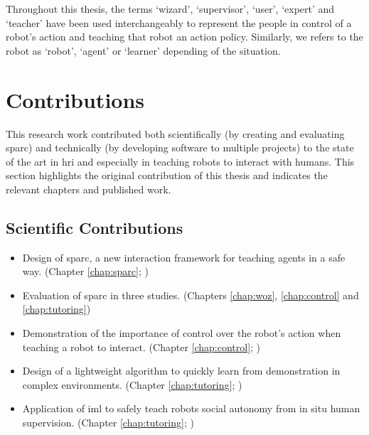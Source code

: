 Throughout this thesis, the terms `wizard', `supervisor', `user', `expert' and `teacher' have been used interchangeably to represent the people in control of a robot's action and teaching that robot an action policy. Similarly, we refers to the robot as `robot', `agent' or `learner' depending of the situation.
%
%

\section{Contributions}\label{sec:intro-contr}

This research work contributed both scientifically (by creating and evaluating \gls{sparc}) and technically (by developing software to multiple projects) to the state of the art in \gls{hri} and especially in teaching robots to interact with humans. This section highlights the original contribution of this thesis and indicates the relevant chapters and published work.

\subsection{Scientific Contributions}
\begin{itemize}
	\item Design of \gls{sparc}, a new interaction framework for teaching agents in a safe way. (Chapter \ref{chap:sparc}; \citealt{senft2015human,senft2015sparc})
	\item Evaluation of \gls{sparc} in three studies. (Chapters \ref{chap:woz}, \ref{chap:control} and \ref{chap:tutoring})
	\item Demonstration of the importance of control over the robot's action when teaching a robot to interact. (Chapter \ref{chap:control}; \citealt{senft2016sparc,senft2017supervised})
	\item Design of a lightweight algorithm to quickly learn from demonstration in complex environments. (Chapter \ref{chap:tutoring}; \citealt{senft2017toward})
	\item Application of \gls{iml} to safely teach robots social autonomy from in situ human supervision. (Chapter \ref{chap:tutoring}; \citealt{senft2018robots})
\end{itemize}

